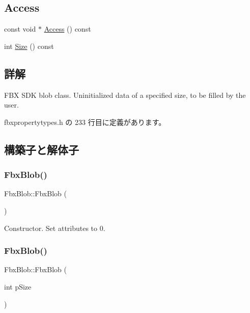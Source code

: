 \subsection*{Access}
\begin{DoxyCompactItemize}
\item 
const void $\ast$ \hyperlink{class_fbx_blob_a5fb39826dd62378bcf18b4de9db38509}{Access} () const
\item 
int \hyperlink{class_fbx_blob_a4b391b461d5303f6a1f24ae910b4e5c8}{Size} () const
\end{DoxyCompactItemize}


\subsection{詳解}
F\+BX S\+DK blob class. Uninitialized data of a specified size, to be filled by the user. 

 fbxpropertytypes.\+h の 233 行目に定義があります。



\subsection{構築子と解体子}
\mbox{\label{class_fbx_blob_ad1013b102b7e2b54e5cb3ffe326e0738}} 
\subsubsection{\texorpdfstring{Fbx\+Blob()}{FbxBlob()}\hspace{0.1cm}{\footnotesize\ttfamily [1/4]}}
{\footnotesize\ttfamily Fbx\+Blob\+::\+Fbx\+Blob (\begin{DoxyParamCaption}{ }\end{DoxyParamCaption})}



Constructor. Set attributes to 0. 

\mbox{\label{class_fbx_blob_aaab0ee64d11daa7aff57542daad4105e}} 
\subsubsection{\texorpdfstring{Fbx\+Blob()}{FbxBlob()}\hspace{0.1cm}{\footnotesize\ttfamily [2/4]}}
{\footnotesize\ttfamily Fbx\+Blob\+::\+Fbx\+Blob (\begin{DoxyParamCaption}\item[{int}]{p\+Size }\end{DoxyParamCaption})}

